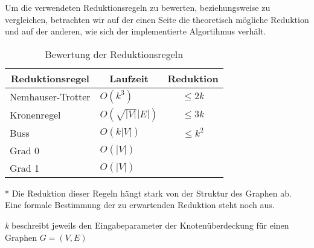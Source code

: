 Um die verwendeten Reduktionsregeln zu bewerten, beziehungsweise zu vergleichen, betrachten wir auf der einen Seite die theoretisch mögliche Reduktion und auf der anderen, wie sich der implementierte Algortihmus verhält. 



\begin{table}[htb]
\caption{Bewertung der Reduktionsregeln\label{tab:liste}}
\vspace*{1em}
\centering

\bgroup
\def\arraystretch{1.3}%
\begin{threeparttable}
\begin{tabular}[c]{l|l|c}
	
	\multicolumn{1}{c|}{\textbf{Reduktionsregel}} & 
	\multicolumn{1}{c|}{\textbf{Laufzeit}} & 
	\multicolumn{1}{c}{\textbf{Reduktion}} \\ 
	
	\hline

	Nemhauser-Trotter&$O(k^{3})$&  $\leq 2k$\\
	Kronenregel&$O(\sqrt{|V|}|E|)$ & $\leq 3k$\\
	Buss&$O(k|V|)$  & $\leq k^{2}$\\
	Grad 0&$O(|V|)$& \tnote{*} \\
	Grad 1&$O(|V|)$& \tnote{*} \\
	
\end{tabular}

\begin{tablenotes}\footnotesize
\item[*] Die Reduktion dieser Regeln hängt stark von der Struktur des Graphen ab. Eine formale Bestimmung der zu erwartenden Reduktion steht noch aus.
\item \emph{k} beschreibt jeweils den Eingabeparameter der Knotenüberdeckung für einen Graphen $G=(V,E)$
\end{tablenotes}

\end{threeparttable}

\egroup

\end{table}

